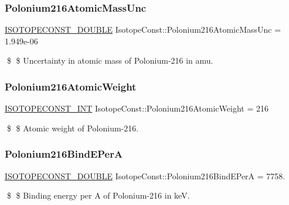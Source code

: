 \subsubsection{\texorpdfstring{Polonium216\+Atomic\+Mass\+Unc}{Polonium216AtomicMassUnc}}
{\footnotesize\ttfamily \mbox{\hyperlink{group___isotope_const-_macros_ga8f45a7272ce02c0b4c65c44636ed719a}{I\+S\+O\+T\+O\+P\+E\+C\+O\+N\+S\+T\+\_\+\+D\+O\+U\+B\+LE}} Isotope\+Const\+::\+Polonium216\+Atomic\+Mass\+Unc = 1.\+949e-\/06}

\$ \$ Uncertainty in atomic mass of Polonium-\/216 in amu. \mbox{\label{group___isotope_const-_polonium-_po216_gaa1abecbce5fa3130ec83a5a33c87079d}} 
\subsubsection{\texorpdfstring{Polonium216\+Atomic\+Weight}{Polonium216AtomicWeight}}
{\footnotesize\ttfamily \mbox{\hyperlink{group___isotope_const-_macros_ga5f18360b3e99483a35c32d789e62621c}{I\+S\+O\+T\+O\+P\+E\+C\+O\+N\+S\+T\+\_\+\+I\+NT}} Isotope\+Const\+::\+Polonium216\+Atomic\+Weight = 216}

\$ \$ Atomic weight of Polonium-\/216. \mbox{\label{group___isotope_const-_polonium-_po216_gabe9bbe70a6e6512f63892adc791dcb93}} 
\subsubsection{\texorpdfstring{Polonium216\+Bind\+E\+PerA}{Polonium216BindEPerA}}
{\footnotesize\ttfamily \mbox{\hyperlink{group___isotope_const-_macros_ga8f45a7272ce02c0b4c65c44636ed719a}{I\+S\+O\+T\+O\+P\+E\+C\+O\+N\+S\+T\+\_\+\+D\+O\+U\+B\+LE}} Isotope\+Const\+::\+Polonium216\+Bind\+E\+PerA = 7758.}

\$ \$ Binding energy per A of Polonium-\/216 in keV. \mbox{\label{group___isotope_const-_polonium-_po216_ga3647e2593ddc17182c584c8f20e7422d}} 
